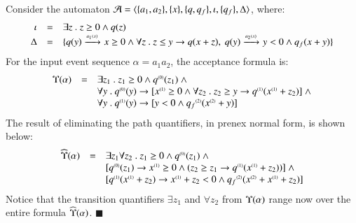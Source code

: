 \begin{example}\label{ex:quant-elim}
  Consider the automaton $\mathcal{A} = \langle \{ a_1,a_2 \}, \{ x \},
    \{ q,q_f \}, \iota, \{ q_f \}, \Delta \rangle$, where:
  \[\begin{array}{rcl}
  \iota & = & \exists z ~.~ z \geq 0 \wedge q(z) \\
  \Delta & = & \{ 
    q(y) \xrightarrow{{\scriptscriptstyle a_1(x)}}_{{\scriptstyle }} x\geq 0 \wedge \forall z ~.~ z \leq y \rightarrow q(x+z),~
    q(y) \xrightarrow{{\scriptscriptstyle a_2(x)}}_{{\scriptstyle }} y<0 \wedge q_f(x+y)
   \}
  \end{array}\]
  For the input event sequence $\alpha = a_1a_2$, the acceptance
  formula is:
  \[\begin{array}{rcl}
  \Upsilon({\alpha}) & = & \exists z_1 ~.~ z_1 \geq 0 \wedge {q}^{\scriptscriptstyle{({0})}}(z_1) ~\wedge \\
  && \forall y ~.~ {q}^{\scriptscriptstyle{({0})}}(y) \rightarrow [{x}^{\scriptscriptstyle{({1})}}\geq0 \wedge \forall z_2 ~.~ z_2\geq y 
    \rightarrow {q}^{\scriptscriptstyle{({1})}}({x}^{\scriptscriptstyle{({1})}}+z_2)] ~\wedge \\
  && \forall y ~.~ {q}^{\scriptscriptstyle{({1})}}(y) \rightarrow [y<0 \wedge {q_f}^{\scriptscriptstyle{({2})}}({x}^{\scriptscriptstyle{({2})}}+y)]
  \end{array}\]
  The result of eliminating the path quantifiers, in prenex normal form, is shown below:
  \[\begin{array}{rcl}
  \widehat{\Upsilon}({\alpha}) & = & \exists z_1\forall z_2 ~.~ z_1 \geq 0 \wedge {q}^{\scriptscriptstyle{({0})}}(z_1) ~\wedge \\
  && [{q}^{\scriptscriptstyle{({0})}}(z_1) \rightarrow {x}^{\scriptscriptstyle{({1})}} \geq 0 \wedge (z_2 \geq z_1 \rightarrow {q}^{\scriptscriptstyle{({1})}}({x}^{\scriptscriptstyle{({1})}}+z_2))] ~\wedge \\
  && [{q}^{\scriptscriptstyle{({1})}}({x}^{\scriptscriptstyle{({1})}}+z_2) \rightarrow {x}^{\scriptscriptstyle{({1})}}+z_2 < 0 \wedge {q_f}^{\scriptscriptstyle{({2})}}({x}^{\scriptscriptstyle{({2})}}+{x}^{\scriptscriptstyle{({1})}}+z_2)]   
  \end{array}\]
  Notice that the transition quantifiers $\exists z_1$ and $\forall
  z_2$ from $\Upsilon({\alpha})$ range now over the entire formula
  $\widehat{\Upsilon}({\alpha})$. \hfill$\blacksquare$
\end{example}

